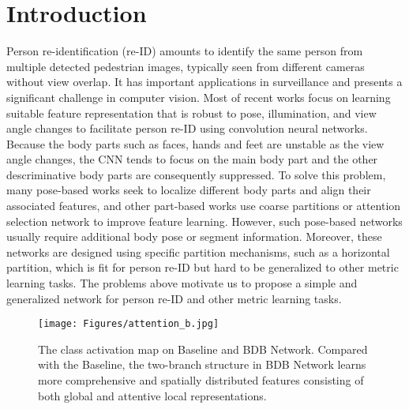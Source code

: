 \documentclass[10pt,twocolumn,letterpaper]{article}
\begin{document}
\section{Introduction}
Person re-identification (re-ID) amounts to identify the same person from multiple detected pedestrian images, typically seen from different cameras without view overlap. It has important applications in surveillance and presents a significant challenge in computer vision. Most of recent works focus on learning suitable feature representation that is robust to pose, illumination, and view angle changes to facilitate person re-ID using convolution neural networks. 
Because the body parts such as faces, hands and feet are unstable as the view angle changes, the CNN tends to focus on the main body part and the other descriminative body parts are consequently suppressed. To solve this problem, many pose-based works \cite{kumar2017pose,su2017pose,suh2018part,zheng2017pose,zhao2017deeply} seek to localize different body parts and align their associated features, and other part-based works \cite{cheng2016person,li2018harmonious,liu2017end,liu2017hydraplus,sun2017beyond,varior2016lstm,xiao2017joint} use coarse partitions or attention selection network to improve feature learning. 
However, such pose-based networks usually require additional body pose or segment information.
Moreover, these networks are designed using specific partition mechanisms, such as a horizontal partition, which is fit for person re-ID but hard to be generalized to other metric learning tasks. The problems above motivate us to propose a simple and generalized network for person re-ID and other metric learning tasks. 

\begin{figure}[t]
    \centering
    \texttt{[image: Figures/attention\_b.jpg]}
    \caption{The class activation map on Baseline and BDB Network. Compared with the Baseline, the two-branch structure in BDB Network learns more comprehensive and spatially distributed features \textcolor{myRed}{consisting} of both global and attentive local representations.}
    \label{fig:attention}
\end{figure}
\end{document}
